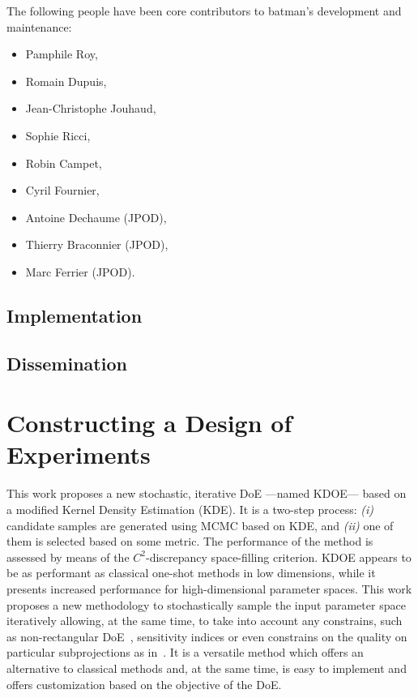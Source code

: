 The following people have been core contributors to batman's development and maintenance:

\begin{itemize}
\item Pamphile Roy,
\item Romain Dupuis,
\item Jean-Christophe Jouhaud,
\item Sophie Ricci,
\item Robin Campet,
\item Cyril Fournier,
\item Antoine Dechaume (JPOD),
\item Thierry Braconnier (JPOD),
\item Marc Ferrier (JPOD).
\end{itemize}

\section{Implementation}



\section{Dissemination}


\chapter{Constructing a Design of Experiments}\label{chap:doe}

This work proposes a new stochastic, iterative DoE ---\thinspace named KDOE\thinspace--- based on a modified Kernel Density Estimation (KDE). It is a two-step process: \emph{(i)} candidate samples are generated using MCMC based on KDE, and \emph{(ii)} one of them is selected based on some metric. The performance of the method is assessed by means of the $C^2$-discrepancy space-filling criterion. KDOE appears to be as performant as classical one-shot methods in low dimensions, while it presents increased performance for high-dimensional parameter spaces. This work proposes a new  methodology to stochastically sample the input parameter space iteratively allowing, at the same time, to take into account any constrains, such as non-rectangular DoE~\citep{Lekivetz2015}, sensitivity indices or even constrains on the quality on particular subprojections as in~\citep{Joseph2015}. It is a versatile method which offers an alternative to classical methods and, at the same time, is easy to implement and offers customization based on the objective of the DoE.

